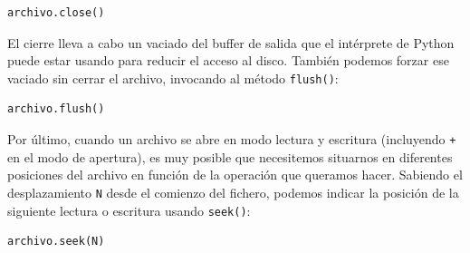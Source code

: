 \begin{lstlisting}
archivo.close()
\end{lstlisting}

El cierre lleva a cabo un vaciado del buffer de salida que el intérprete de Python puede estar usando para reducir el acceso al disco. También podemos forzar ese vaciado sin cerrar el archivo, invocando al método \texttt{flush()}:

\begin{lstlisting}
archivo.flush()
\end{lstlisting}

Por último, cuando un archivo se abre en modo lectura y escritura (incluyendo \texttt{+} en el modo de apertura), es muy posible que necesitemos situarnos en diferentes posiciones del archivo en función de la operación que queramos hacer. Sabiendo el desplazamiento \texttt{N} desde el comienzo del fichero, podemos indicar la posición de la siguiente lectura o escritura usando \texttt{seek()}:

\begin{lstlisting}
archivo.seek(N)
\end{lstlisting}

